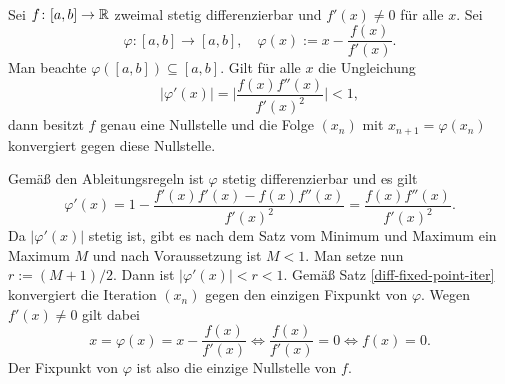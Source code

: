\begin{Satz}%
\mbox{}\\
Sei $f\colon [a,b]\to\mathbb R$ zweimal stetig differenzierbar und
$f'(x)\ne 0$ für alle $x$. Sei%
\[\varphi\colon [a,b]\to [a,b],\quad \varphi(x):=x-\frac{f(x)}{f'(x)}.\]
Man beachte $\varphi([a,b])\subseteq [a,b]$. Gilt für alle $x$ die Ungleichung%
\[|\varphi'(x)| = \bigg|\frac{f(x)f''(x)}{f'(x)^2}\bigg| < 1,\]
dann besitzt $f$ genau eine Nullstelle und die Folge $(x_n)$ mit
$x_{n+1}=\varphi(x_n)$ konvergiert gegen diese Nullstelle.
\end{Satz}

\begin{Beweis}
Gemäß den Ableitungsregeln ist $\varphi$ stetig differenzierbar
und es gilt%
\[\varphi'(x) = 1-\frac{f'(x)f'(x)-f(x)f''(x)}{f'(x)^2}
= \frac{f(x)f''(x)}{f'(x)^2}.\]
Da $|\varphi'(x)|$ stetig ist, gibt es nach dem Satz vom Minimum
und Maximum ein Maximum $M$ und nach Voraussetzung ist $M<1$.
Man setze nun $r:=(M+1)/2$. Dann ist $|\varphi'(x)|<r<1$.
Gemäß Satz \ref{diff-fixed-point-iter} konvergiert die Iteration
$(x_n)$ gegen den einzigen Fixpunkt von $\varphi$. Wegen $f'(x)\ne 0$
gilt dabei%
\[x = \varphi(x) = x-\frac{f(x)}{f'(x)} \iff \frac{f(x)}{f'(x)}=0\iff f(x)=0.\]
Der Fixpunkt von $\varphi$ ist also die einzige Nullstelle von $f$.\;\qedsymbol
\end{Beweis}

